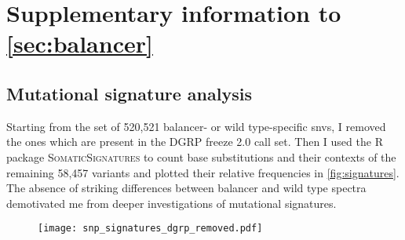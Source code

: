 \chapter{Supplementary information to \texorpdfstring{\cref{sec:balancer}}{the balancer project}}
\label{sec:suppl_balancer}

\section{Mutational signature analysis}
\label{sec:suppl_mutsign}

Starting from the set of 520,521 balancer- or wild type-specific \acp{snv},
I removed the ones which are present in the DGRP freeze 2.0 \snv call set.
Then I used the R package \textsc{SomaticSignatures} \citep{Gehring2015} to
count base substitutions and their contexts of the remaining 58,457 variants
and plotted their relative frequencies in \cref{fig:signatures}. The absence
of striking differences between balancer and wild type spectra demotivated me
from deeper investigations of mutational signatures.

\begin{figure}[!ht]
  \texttt{[image: snp\_signatures\_dgrp\_removed.pdf]}%
\end{figure}
